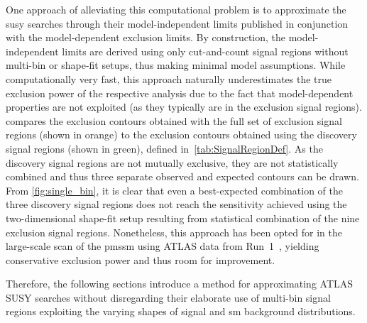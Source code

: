 One approach of alleviating this computational problem is to approximate the \gls{susy} searches through their model-independent limits published in conjunction with the model-dependent exclusion limits. By construction, the model-independent limits are derived using only cut-and-count signal regions without multi-bin or shape-fit setups, thus making minimal model assumptions. While computationally very fast, this approach naturally underestimates the true exclusion power of the respective analysis due to the fact that model-dependent properties are not exploited (as they typically are in the exclusion signal regions).  compares the exclusion contours obtained with the full set of exclusion signal regions (shown in orange) to the exclusion contours obtained using the discovery signal regions (shown in green), defined in~\cref{tab:SignalRegionDef}. As the discovery signal regions are not mutually exclusive, they are not statistically combined and thus three separate observed and expected contours can be drawn. From \cref{fig:single_bin}, it is clear that even a best-expected combination of the three discovery signal regions does not reach the sensitivity achieved using the two-dimensional shape-fit setup resulting from statistical combination of the nine exclusion signal regions. Nonetheless, this approach has been opted for in the large-scale scan of the \gls{pmssm} using ATLAS data from Run~1~\cite{SUSY-2014-08}, yielding conservative exclusion power and thus room for improvement.

Therefore, the following sections introduce a method for approximating ATLAS SUSY searches without disregarding their elaborate use of multi-bin signal regions exploiting the varying shapes of signal and \gls{sm} background distributions. 

